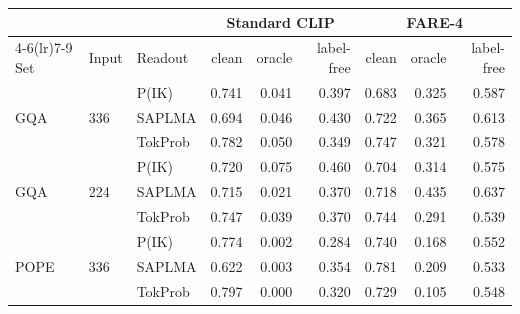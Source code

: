 \footnotesize
\setlength{\tabcolsep}{5pt}
\begin{tabular}{@{}lll rrr rrr@{}}
\toprule
 &  &  & \multicolumn{3}{c}{Standard CLIP} & \multicolumn{3}{c}{FARE-4} \\
\cmidrule(lr){4-6}\cmidrule(lr){7-9}
Set & Input & Readout & clean & oracle & label-free & clean & oracle & label-free \\
\midrule
\multirow{3}{*}{GQA} & \multirow{3}{*}{336} & P(IK) & 0.741 & 0.041 & 0.397 & 0.683 & 0.325 & 0.587 \\
 &  & SAPLMA & 0.694 & 0.046 & 0.430 & 0.722 & 0.365 & 0.613 \\
 &  & TokProb & 0.782 & 0.050 & 0.349 & 0.747 & 0.321 & 0.578 \\
\midrule
\multirow{3}{*}{GQA} & \multirow{3}{*}{224} & P(IK) & 0.720 & 0.075 & 0.460 & 0.704 & 0.314 & 0.575 \\
 &  & SAPLMA & 0.715 & 0.021 & 0.370 & 0.718 & 0.435 & 0.637 \\
 &  & TokProb & 0.747 & 0.039 & 0.370 & 0.744 & 0.291 & 0.539 \\
\midrule
\multirow{3}{*}{POPE} & \multirow{3}{*}{336} & P(IK) & 0.774 & 0.002 & 0.284 & 0.740 & 0.168 & 0.552 \\
 &  & SAPLMA & 0.622 & 0.003 & 0.354 & 0.781 & 0.209 & 0.533 \\
 &  & TokProb & 0.797 & 0.000 & 0.320 & 0.729 & 0.105 & 0.548 \\
\bottomrule
\end{tabular}
